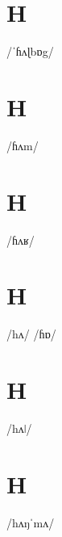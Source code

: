 \documentclass[10pt,a4paper,twoside]{book}
\begin{document}
\section*{H}

\begin{multicols}{3}
 {/ˈɦʌɭbɒg/} {}
\end{multicols}

\section*{H}

\begin{multicols}{3}
 {/ɦʌm/} {}
\end{multicols}

\section*{H}

\begin{multicols}{3}
 {/ɦʌʁ/} {}
\end{multicols}

\section*{H}

\begin{multicols}{3}
 {/hʌ/} {}
 {/ɦɒ/} {}
\end{multicols}

\section*{H}

\begin{multicols}{3}
 {/hʌǀ/} {}
\end{multicols}

\section*{H}

\begin{multicols}{3}
 {/hʌŋˈmʌ/} {}
\end{multicols}
\end{document}
